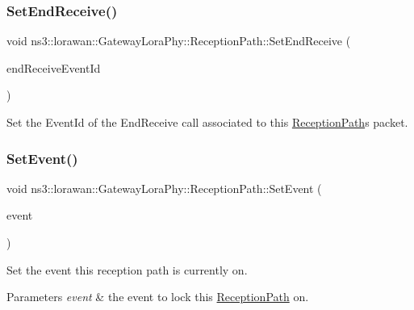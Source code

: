 \subsubsection{\texorpdfstring{Set\+End\+Receive()}{SetEndReceive()}}
{\footnotesize\ttfamily void ns3\+::lorawan\+::\+Gateway\+Lora\+Phy\+::\+Reception\+Path\+::\+Set\+End\+Receive (\begin{DoxyParamCaption}\item[{Event\+Id}]{end\+Receive\+Event\+Id }\end{DoxyParamCaption})}

Set the Event\+Id of the End\+Receive call associated to this \hyperlink{classns3_1_1lorawan_1_1GatewayLoraPhy_1_1ReceptionPath}{Reception\+Path}\textquotesingle{}s packet. \mbox{\label{classns3_1_1lorawan_1_1GatewayLoraPhy_1_1ReceptionPath_a9191f5d01e50e1f26a8d98686db00c43}} 
\subsubsection{\texorpdfstring{Set\+Event()}{SetEvent()}}
{\footnotesize\ttfamily void ns3\+::lorawan\+::\+Gateway\+Lora\+Phy\+::\+Reception\+Path\+::\+Set\+Event (\begin{DoxyParamCaption}\item[{Ptr$<$ \hyperlink{classns3_1_1lorawan_1_1LoraInterferenceHelper_1_1Event}{Lora\+Interference\+Helper\+::\+Event} $>$}]{event }\end{DoxyParamCaption})}

Set the event this reception path is currently on.


\begin{DoxyParams}{Parameters}
{\em event} & the event to lock this \hyperlink{classns3_1_1lorawan_1_1GatewayLoraPhy_1_1ReceptionPath}{Reception\+Path} on. \\
\hline
\end{DoxyParams}
\mbox{\label{classns3_1_1lorawan_1_1GatewayLoraPhy_1_1ReceptionPath_af9d0ef70517c2089f393c89a9270b490}} 
